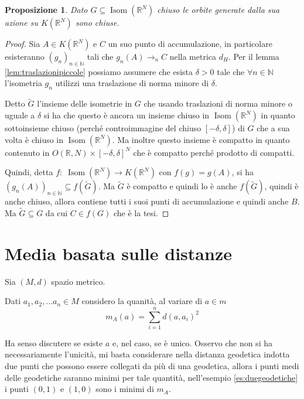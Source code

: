 \documentclass[a4paper,10pt]{article}
\newcounter{counter1}
\theoremstyle{plain}
\newtheorem{mypro}[counter1]{Proposizione}
\theoremstyle{definition}
\theoremstyle{remark}
\newcommand{\pa}[1]{\left(#1\right)}
\newcommand{\bra}[1]{\left[#1\right]}
\DeclareMathOperator{\isom}{Isom}
\begin{document}
\begin{mypro}
  Dato $G \subseteq \isom(\mathbb{R}^N)$ chiuso le orbite generate
  dalla sua azione su $K(\mathbb{R}^N)$ sono chiuse.
\end{mypro}
\begin{proof}
  Sia $A \in K(\mathbb{R}^N)$ e $C$ un suo punto di accumulazione, in
  particolare esisteranno $\pa{g_n}_{n\in \mathbb{N}}$ tali che
  $g_n(A) \to _n C$ nella metrica $d_H$. Per il lemma
  \ref{lem:traslazionipiccole} possiamo assumere che esista $\delta >
  0$ tale che $\forall n \in \mathbb{N}$ l'isometria $g_n$ utilizzi una
  traslazione di norma minore di $\delta$.

  Detto $\tilde G$ l'insieme delle isometrie in $G$ che usando
  traslazioni di norma minore o uguale a $\delta$ si ha che questo è
  ancora un insieme chiuso in $\isom\pa{\mathbb{R}^N}$ in quanto
  sottoinsieme chiuso (perché controimmagine del chiuso
  $\bra{-\delta,\delta}$) di $G$ che a sua volta è chiuso in
  $\isom(\mathbb{R}^N)$. Ma inoltre questo insieme è compatto in
  quanto contenuto in $O(\mathbb{R},N) \times \bra{-\delta,\delta}^N$
  che è compatto perché prodotto di compatti.
  
  Quindi, detta $f:\; \isom(\mathbb{R}^N) \to K(\mathbb{R}^N)$ con
  $f(g) = g(A)$, si ha $\pa{ g_n(A) }_{n \in \mathbb{N}} \subseteq
  f(\tilde G)$. Ma $\tilde G$ è compatto e quindi lo è anche $f(\tilde
  G)$, quindi è anche chiuso, allora contiene tutti i suoi punti di
  accumulazione e quindi anche $B$. Ma $\tilde G \subseteq G$ da cui
  $C \in f(G)$ che è la tesi.
\end{proof}

\section{Media basata sulle distanze}

Sia $(M,d)$ spazio metrico.

Dati $a_1,a_2,... a_n \in M$ considero la quanità, al variare di $a
\in m$
\[ m_A (a) = \sum _{i = 1} ^n d(a,a_i)^2 \]

Ha senso discutere se esiste $a$ e, nel caso, se è unico. Osservo che
non si ha necessariamente l'unicità, mi basta considerare nella
distanza geodetica indotta due punti che possono essere collegati da
più di una geodetica, allora i punti medi delle geodetiche saranno
minimi per tale quantità, nell'esempio \ref{es:duegeodetiche} i punti
$(0,1)$ e $(1,0)$ sono i minimi di $m_A$.

\newpage
\end{document}
